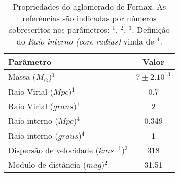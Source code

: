 

\begin{table}[!ht]
    \centering    
    \caption{Propriedades do aglomerado de Fornax. As referências são indicadas por números sobrescritos nos parâmetros: $^1$\citealp{Drinkwater_2001}, $^2$\citealp{Blakeslee_2009}, $^3$\citealp{Maddox_2019}. Definição do \textit{Raio interno (core radius)} vinda de $^4$\cite{Saifollahi_2021}.}   
    \begin{tabular}{lc}
        \toprule
        Parâmetro &  Valor\\
        \midrule
        Massa ($M_\odot$)$^1$ & $7\pm 2. 10^{13}$ \\
        Raio Virial ($Mpc$)$^1$ & 0.7 \\
        Raio Virial ($graus$)$^1$ & 2 \\
        Raio interno ($Mpc$)$^4$ & 0.349 \\
        Raio interno ($graus$)$^4$ & 1 \\
        Dispersão de velocidade ($km s^{-1}$)$^3$ & 318 \\
        Modulo de distância ($mag$)$^2$ & 31.51 \\
        \bottomrule
    \end{tabular}
    \label{tab:properties_fornax}
\end{table}

